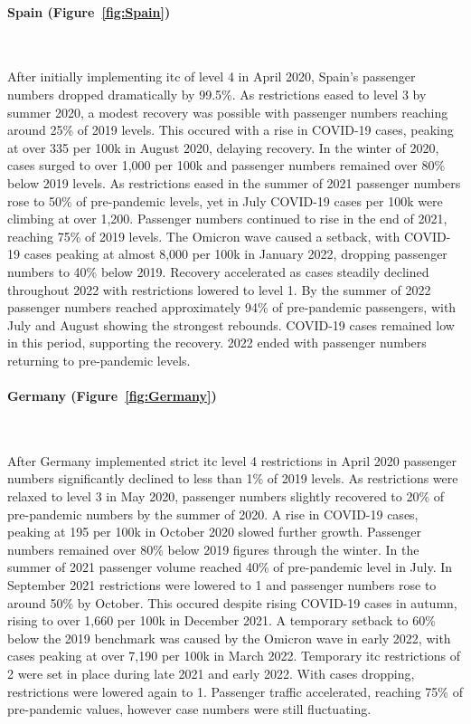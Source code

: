 \documentclass[12pt,onehalfspacing,headsepline,oneside,openright,a4paper, fleqn]{report}
\begin{document}
\newpage
\paragraph{Spain (Figure~\ref{fig:Spain})}
\

After initially implementing \gls{itc} of level 4 in April 2020, Spain's passenger numbers dropped dramatically by 99.5\%. As restrictions eased to level 3 by summer 2020, a modest recovery was possible with passenger numbers reaching around 25\% of 2019 levels. This occured with a rise in COVID-19 cases, peaking at over 335 per 100k in August 2020, delaying recovery. In the winter of 2020, cases surged to over 1,000 per 100k and passenger numbers remained over 80\% below 2019 levels. As restrictions eased in the summer of 2021 passenger numbers rose to 50\% of pre-pandemic levels, yet in July COVID-19 cases per 100k were climbing at over 1,200. Passenger numbers continued to rise in the end of 2021, reaching 75\% of 2019 levels. The Omicron wave caused a setback, with COVID-19 cases peaking at almost 8,000 per 100k in January 2022, dropping passenger numbers to 40\% below 2019. Recovery accelerated as cases steadily declined throughout 2022 with restrictions lowered to level 1. By the summer of 2022 passenger numbers reached approximately 94\% of pre-pandemic passengers, with July and August showing the strongest rebounds. COVID-19 cases remained low in this period, supporting the recovery. 2022 ended with passenger numbers returning to pre-pandemic levels.

\paragraph{Germany (Figure~\ref{fig:Germany})}
\

After Germany implemented strict \gls{itc} level 4 restrictions in April 2020 passenger numbers significantly declined to less than 1\% of 2019 levels. As restrictions were relaxed to level 3 in May 2020, passenger numbers slightly recovered to 20\% of pre-pandemic numbers by the summer of 2020. A rise in COVID-19 cases, peaking at 195 per 100k in October 2020 slowed further growth. Passenger numbers remained over 80\% below 2019 figures through the winter. In the summer of 2021 passenger volume reached 40\% of pre-pandemic level in July. In September 2021 restrictions were lowered to 1 and passenger numbers rose to around 50\% by October. This occured despite rising COVID-19 cases in autumn, rising to over 1,660 per 100k in December 2021. A temporary setback to 60\% below the 2019 benchmark was caused by the Omicron wave in early 2022, with cases peaking at over 7,190 per 100k in March 2022. Temporary \gls{itc} restrictions of 2 were set in place during late 2021 and early 2022. With cases dropping, restrictions were lowered again to 1. Passenger traffic accelerated, reaching 75\% of pre-pandemic values, however case numbers were still fluctuating.
\end{document}
